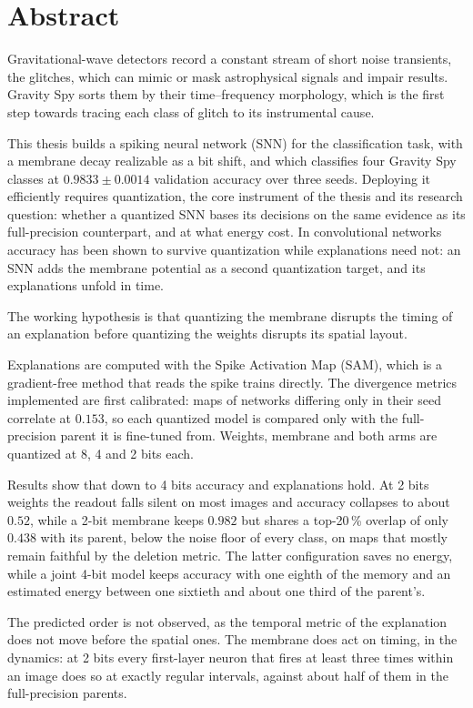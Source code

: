 \chapter*{Abstract}

Gravitational-wave detectors record a constant stream of short noise transients,
the glitches, which can mimic or mask astrophysical signals and impair results. 
Gravity Spy sorts
them by their time--frequency morphology, which is the first step towards tracing each
class of glitch to its instrumental cause.

This thesis builds a spiking neural network (SNN) for the classification 
task, with a membrane
decay realizable as a bit shift, and which classifies four Gravity Spy classes at
$0.9833 \pm 0.0014$ validation accuracy over three seeds. Deploying it
efficiently requires quantization, the core instrument of the thesis and its research question:
 whether a quantized SNN
bases its decisions on the same evidence as its full-precision counterpart, and
at what energy cost. In convolutional networks accuracy has been shown to survive
quantization while explanations need not: an SNN adds the membrane potential as a
second quantization target, and its explanations unfold in time.

The working
hypothesis is that quantizing the membrane disrupts the timing of an explanation
before quantizing the weights disrupts its spatial layout.

Explanations are computed with the Spike Activation Map (SAM), which is 
a gradient-free method
that reads the spike trains directly. The divergence metrics implemented
are first calibrated: maps of networks differing only in their seed correlate at $0.153$, so
each quantized model is compared only with the full-precision parent it is
fine-tuned from. Weights, membrane and both arms are quantized at 8, 4 and 2 bits each.

Results show that down to 4 bits accuracy and explanations hold. 
At 2 bits weights the readout falls silent on most images and accuracy
collapses to about $0.52$,
while a 2-bit membrane keeps $0.982$ but
shares a top-20\,\% overlap of only $0.438$ with its parent, below the noise
floor of every class, on maps that mostly remain faithful by the deletion
metric. The
latter configuration saves no energy, while a joint 4-bit model keeps accuracy
with one eighth of the memory and an estimated energy between one sixtieth and
about one third of the parent's.

The predicted order is not observed, as the temporal metric of the explanation does
not move before the spatial ones. The membrane does act on timing,
in the dynamics: at 2 bits every first-layer neuron that fires at least
three times within an image does so at exactly regular intervals, against about
half of them in the full-precision parents.